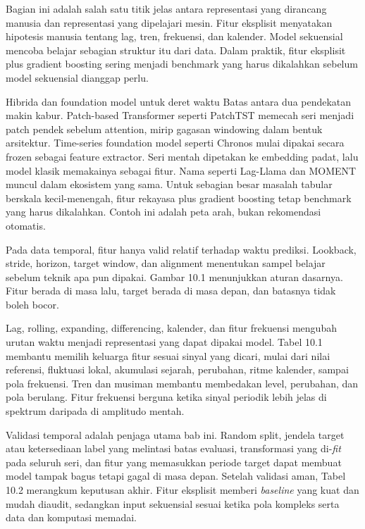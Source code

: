 Bagian ini adalah salah satu titik jelas antara representasi yang dirancang manusia dan representasi yang dipelajari mesin. Fitur eksplisit menyatakan hipotesis manusia tentang lag, tren, frekuensi, dan kalender. Model sekuensial mencoba belajar sebagian struktur itu dari data. Dalam praktik, fitur eksplisit plus gradient boosting sering menjadi benchmark yang harus dikalahkan sebelum model sekuensial dianggap perlu.

\begin{pendalaman}{Hibrida dan foundation model untuk deret waktu}
Batas antara dua pendekatan makin kabur. Patch-based Transformer seperti PatchTST memecah seri menjadi patch pendek sebelum attention, mirip gagasan windowing dalam bentuk arsitektur. Time-series foundation model seperti Chronos mulai dipakai secara frozen sebagai feature extractor. Seri mentah dipetakan ke embedding padat, lalu model klasik memakainya sebagai fitur. Nama seperti Lag-Llama dan MOMENT muncul dalam ekosistem yang sama. Untuk sebagian besar masalah tabular berskala kecil-menengah, fitur rekayasa plus gradient boosting tetap benchmark yang harus dikalahkan. Contoh ini adalah peta arah, bukan rekomendasi otomatis.
\end{pendalaman}

\begin{sintesis}

Pada data temporal, fitur hanya valid relatif terhadap waktu prediksi. Lookback, stride, horizon, target window, dan alignment menentukan sampel belajar sebelum teknik apa pun dipakai. Gambar 10.1 menunjukkan aturan dasarnya. Fitur berada di masa lalu, target berada di masa depan, dan batasnya tidak boleh bocor.

Lag, rolling, expanding, differencing, kalender, dan fitur frekuensi mengubah urutan waktu menjadi representasi yang dapat dipakai model. Tabel 10.1 membantu memilih keluarga fitur sesuai sinyal yang dicari, mulai dari nilai referensi, fluktuasi lokal, akumulasi sejarah, perubahan, ritme kalender, sampai pola frekuensi. Tren dan musiman membantu membedakan level, perubahan, dan pola berulang. Fitur frekuensi berguna ketika sinyal periodik lebih jelas di spektrum daripada di amplitudo mentah.

Validasi temporal adalah penjaga utama bab ini. Random split, jendela target atau ketersediaan label yang melintasi batas evaluasi, transformasi yang di-\emph{fit} pada seluruh seri, dan fitur yang memasukkan periode target dapat membuat model tampak bagus tetapi gagal di masa depan. Setelah validasi aman, Tabel 10.2 merangkum keputusan akhir. Fitur eksplisit memberi \emph{baseline} yang kuat dan mudah diaudit, sedangkan input sekuensial sesuai ketika pola kompleks serta data dan komputasi memadai.

\end{sintesis}


